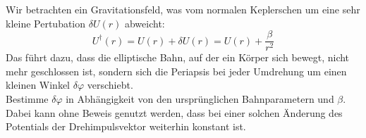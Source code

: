 \begin{Exercise}[label = phshift, title = Periheldrehung, difficulty = 5, origin = Aaron Wild]
	Wir betrachten ein Gravitationsfeld, was vom normalen Keplerschen um eine sehr kleine Pertubation $\delta U\left(r\right)$ abweicht:
	\begin{equation}\label{phshift:pot}
		U^\dagger\left(r\right) = U\left(r\right) + \delta U\left(r\right) = U\left(r\right)+\frac{\beta}{r^2}
	\end{equation}
	Das führt dazu, dass die elliptische Bahn, auf der ein Körper sich bewegt, nicht mehr geschlossen ist, sondern sich die Periapsis bei jeder Umdrehung um einen kleinen Winkel $\delta \varphi$ verschiebt. \\
	Bestimme $\delta \varphi$ in Abhängigkeit von den ursprünglichen Bahnparametern und $\beta$. \\
	Dabei kann ohne Beweis genutzt werden, dass bei einer solchen Änderung des Potentials der Drehimpulsvektor weiterhin konstant ist.
	
\end{Exercise}

